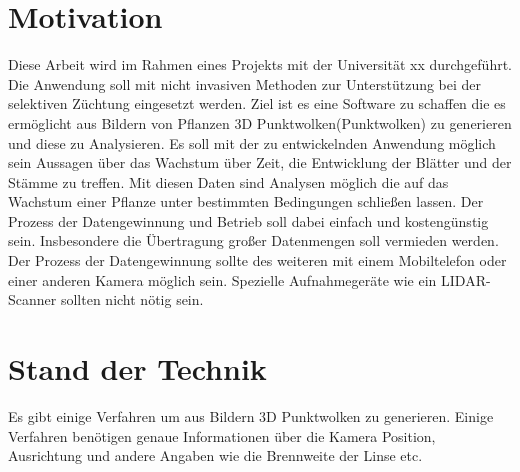 \documentclass[12pt,titlepage]{article}
\begin{document}
\section{Motivation}
\label{sec:einleitung}
Diese Arbeit wird im Rahmen eines Projekts mit der Universität xx durchgeführt. Die Anwendung soll mit nicht invasiven Methoden zur Unterstützung bei der selektiven Züchtung eingesetzt werden.
Ziel ist es eine Software zu schaffen die es ermöglicht aus Bildern von Pflanzen 3D Punktwolken(Punktwolken) zu generieren und diese zu Analysieren.
Es soll mit der zu entwickelnden Anwendung möglich sein Aussagen über das Wachstum über Zeit, die Entwicklung der Blätter und der Stämme zu treffen. 
Mit diesen Daten sind Analysen möglich die auf das Wachstum einer Pflanze unter bestimmten Bedingungen schließen lassen.
Der Prozess der Datengewinnung und Betrieb soll dabei einfach und kostengünstig sein. Insbesondere die Übertragung großer Datenmengen soll vermieden werden.
Der Prozess der Datengewinnung sollte des weiteren mit einem Mobiltelefon oder einer anderen Kamera möglich sein. Spezielle Aufnahmegeräte wie ein LIDAR-Scanner sollten nicht nötig sein.


\newpage
\section{Stand der Technik}
\label{sec:stand}
%

Es gibt einige Verfahren um aus Bildern 3D Punktwolken zu generieren. Einige Verfahren benötigen genaue Informationen über die Kamera Position, Ausrichtung und andere Angaben wie die Brennweite der Linse etc.  
\end{document}
